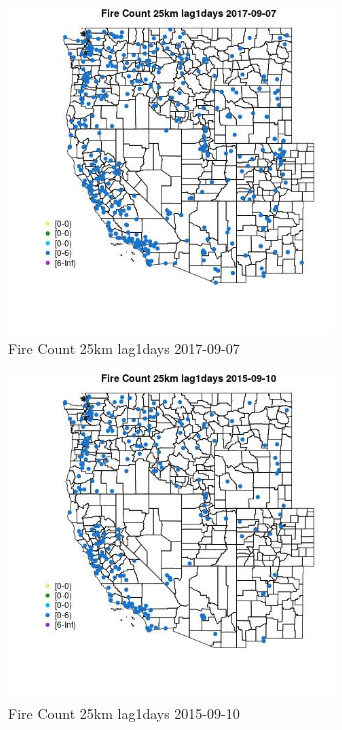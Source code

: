 \begin{figure} 
\centering  
\includegraphics[width=0.77\textwidth]{Code_Outputs/Report_ML_input_PM25_Step4_part_e_de_duplicated_aves_compiled_2019-05-21wNAs_MapObsFire_Count_25km_lag1days2017-09-07.jpg} 
\caption{\label{fig:Report_ML_input_PM25_Step4_part_e_de_duplicated_aves_compiled_2019-05-21wNAsMapObsFire_Count_25km_lag1days2017-09-07}Fire Count 25km lag1days 2017-09-07} 
\end{figure} 
 

\begin{figure} 
\centering  
\includegraphics[width=0.77\textwidth]{Code_Outputs/Report_ML_input_PM25_Step4_part_e_de_duplicated_aves_compiled_2019-05-21wNAs_MapObsFire_Count_25km_lag1days2015-09-10.jpg} 
\caption{\label{fig:Report_ML_input_PM25_Step4_part_e_de_duplicated_aves_compiled_2019-05-21wNAsMapObsFire_Count_25km_lag1days2015-09-10}Fire Count 25km lag1days 2015-09-10} 
\end{figure} 
 

